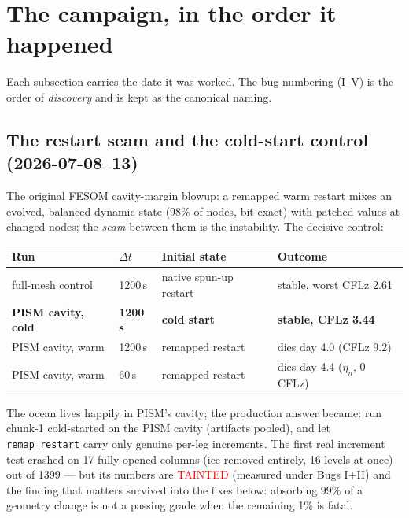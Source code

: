 \documentclass[11pt,a4paper]{article}
\newcommand{\code}[1]{\texttt{\small #1}}
\begin{document}
\tableofcontents

\section{The campaign, in the order it happened}\label{sec:bugs}

Each subsection carries the date it was worked. The bug numbering (I--V) is the order of
\emph{discovery} and is kept as the canonical naming.

\subsection{The restart seam and the cold-start control (2026-07-08--13)}
The original FESOM cavity-margin blowup: a remapped warm restart mixes an evolved, balanced dynamic
state (98\% of nodes, bit-exact) with patched values at changed nodes; the \emph{seam} between them
is the instability. The decisive control:

\begin{center}
\begin{tabular}{@{}llll@{}}
\toprule
Run & $\Delta t$ & Initial state & Outcome \\
\midrule
full-mesh control & 1200\,s & native spun-up restart & stable, worst CFLz 2.61 \\
\textbf{PISM cavity, cold} & \textbf{1200\,s} & \textbf{cold start} & \textbf{stable, CFLz 3.44} \\
PISM cavity, warm & 1200\,s & remapped restart & dies day 4.0 (CFLz 9.2) \\
PISM cavity, warm & 60\,s & remapped restart & dies day 4.4 ($\eta_n$, 0 CFLz) \\
\bottomrule
\end{tabular}
\end{center}

\noindent
The ocean lives happily in PISM's cavity; the production answer became: run chunk-1 cold-started on
the PISM cavity (artifacts pooled), and let \code{remap\_restart} carry only genuine per-leg
increments. The first real increment test crashed on 17 fully-opened columns (ice removed entirely,
16 levels at once) out of 1399 --- but its numbers are \textcolor{red}{TAINTED} (measured under
Bugs I+II) and the finding that matters survived into the fixes below: absorbing 99\% of a geometry
change is not a passing grade when the remaining 1\% is fatal.
\end{document}
